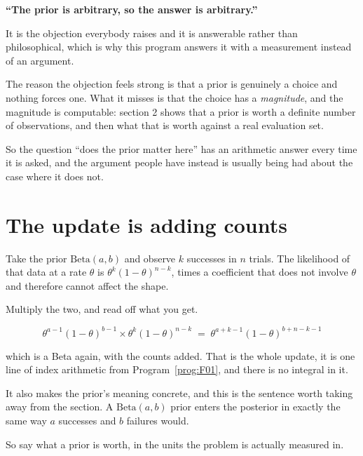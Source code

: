 \begin{fr}
\begin{trapbox}
\textbf{\enquote{The prior is arbitrary, so the answer is arbitrary.}}

It is the objection everybody raises and it is answerable rather than
philosophical, which is why this program answers it with a measurement
instead of an argument.

The reason the objection feels strong is that a prior is genuinely a choice
and nothing forces one. What it misses is that the choice has a
\emph{magnitude}, and the magnitude is computable: section 2 shows that a
prior is worth a definite number of observations, and then what that is worth
against a real evaluation set.

So the question \enquote{does the prior matter here} has an arithmetic answer
every time it is asked, and the argument people have instead is usually being
had about the case where it does not.
\end{trapbox}
\end{fr}

\section{The update is adding counts}
\label{sec:P28-conjugacy}

\begin{fr}
Take the prior $\mathrm{Beta}(a, b)$ and observe $k$ successes in $n$ trials.
The likelihood of that data at a rate $\theta$ is
$\theta^{k}(1-\theta)^{n-k}$, times a coefficient that does not involve
$\theta$ and therefore cannot affect the shape.

Multiply the two, and read off what you get.
\dotline
\nextframe
\end{fr}

\begin{fr}

\[ \theta^{a-1}(1-\theta)^{b-1} \times \theta^{k}(1-\theta)^{n-k}
   \;=\; \theta^{a+k-1}(1-\theta)^{b+n-k-1} \]

which is a Beta again, with the counts added. That is the whole update, it is
one line of index arithmetic from Program~\ref{prog:F01}, and there is no
integral in it.

It also makes the prior's meaning concrete, and this is the sentence worth
taking away from the section. A $\mathrm{Beta}(a, b)$ prior enters the
posterior in exactly the same way $a$ successes and $b$ failures would.

So say what a prior is worth, in the units the problem is actually measured
in.
\dotline
\nextframe
\end{fr}

